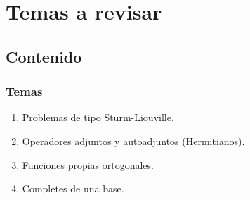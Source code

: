\documentclass[12pt]{beamer}
\numberwithin{equation}{section}
\begin{document}
\section{Temas a revisar}
\subsection{Contenido}

\begin{frame}
\frametitle{Temas}

\begin{enumerate}[<+->]
\item Problemas de tipo Sturm-Liouville.
\item Operadores adjuntos y autoadjuntos (Hermitianos).
\item Funciones propias ortogonales.
\item Completes de una base.
\end{enumerate}
\end{frame}


\end{document}
